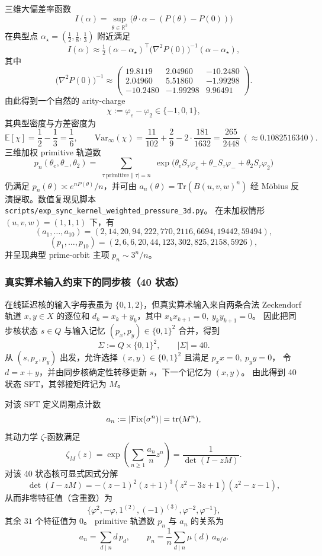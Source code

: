 三维大偏差率函数
\[
I(\alpha)=\sup_{\theta\in\mathbb{R}^3}\bigl(\theta\cdot\alpha-(P(\theta)-P(0))\bigr)
\]
在典型点 $\alpha_\star=(\frac12,\frac18,\frac13)$ 附近满足
\[
I(\alpha)\approx \tfrac12(\alpha-\alpha_\star)^\top\bigl(\nabla^2P(0)\bigr)^{-1}(\alpha-\alpha_\star),
\]
其中
\[
\bigl(\nabla^2P(0)\bigr)^{-1}\approx
\begin{pmatrix}
19.8119 & 2.04960 & -10.2480\\
2.04960 & 5.51860 & -1.99298\\
-10.2480 & -1.99298 & 9.96491
\end{pmatrix}.
\]
由此得到一个自然的 arity-charge
\[
\chi:=\varphi_e-\varphi_2\in\{-1,0,1\},
\]
其典型密度与方差密度为
\[
\mathbb{E}[\chi]=\frac12-\frac13=\frac16,\qquad
\mathrm{Var}_\infty(\chi)=\frac{11}{102}+\frac{2}{9}-2\cdot\frac{181}{1632}=\frac{265}{2448}\ (\approx 0.1082516340).
\]
三维加权 primitive 轨道数
\[
p_n(\theta_e,\theta_-,\theta_2)=\sum_{\substack{\tau\ \mathrm{primitive}\|\tau|=n}}
\exp\!\bigl(\theta_e S_\tau\varphi_e+\theta_-S_\tau\varphi_-+\theta_2S_\tau\varphi_2\bigr)
\]
仍满足 $p_n(\theta)\asymp e^{nP(\theta)}/n$，并可由
$a_n(\theta)=\mathrm{Tr}(B(u,v,w)^n)$ 经 Möbius 反演提取。数值复现见脚本 \texttt{scripts/exp\_sync\_kernel\_weighted\_pressure\_3d.py}。
在未加权情形 $(u,v,w)=(1,1,1)$ 下，有
\[
(a_1,\dots,a_{10})=(2,14,20,94,222,770,2116,6694,19442,59494),
\]
\[
(p_1,\dots,p_{10})=(2,6,6,20,44,123,302,825,2158,5926),
\]
并呈现典型 prime-orbit 主项 $p_n\sim 3^n/n$。

\subsubsection{真实算术输入约束下的同步核（40 状态）}
在线延迟核的输入字母表虽为 $\{0,1,2\}$，但真实算术输入来自两条合法 Zeckendorf 轨道
$x,y\in X$ 的逐位和 $d_k=x_k+y_k$，其中 $x_kx_{k+1}=0,\ y_ky_{k+1}=0$。
因此把同步核状态 $s\in Q$ 与输入记忆 $(p_x,p_y)\in\{0,1\}^2$ 合并，得到
\[
\Sigma:=Q\times\{0,1\}^2,\qquad |\Sigma|=40.
\]
从 $(s,p_x,p_y)$ 出发，允许选择 $(x,y)\in\{0,1\}^2$ 且满足 $p_xx=0,\ p_yy=0$，
令 $d=x+y$，并由同步核确定性转移更新 $s$，下一个记忆为 $(x,y)$。
由此得到 40 状态 SFT，其邻接矩阵记为 $M$。

对该 SFT 定义周期点计数
\[
a_n:=|{\rm Fix}(\sigma^n)|=\operatorname{tr}(M^n),
\]
其动力学 $\zeta$-函数满足
\[
\zeta_M(z)=\exp\!\left(\sum_{n\ge 1}\frac{a_n}{n}z^n\right)=\frac{1}{\det(I-zM)}.
\]
对该 40 状态核可显式因式分解
\[
\det(I-zM)=-(z-1)^2(z+1)^3(z^2-3z+1)(z^2-z-1),
\]
从而非零特征值（含重数）为
\[
\{\varphi^2,-\varphi,1^{(2)},(-1)^{(3)},\varphi^{-2},\varphi^{-1}\},
\]
其余 $31$ 个特征值为 $0$。
primitive 轨道数 $p_n$ 与 $a_n$ 的关系为
\[
a_n=\sum_{d\mid n} d\,p_d,\qquad
p_n=\frac{1}{n}\sum_{d\mid n}\mu(d)\,a_{n/d}.
\]


